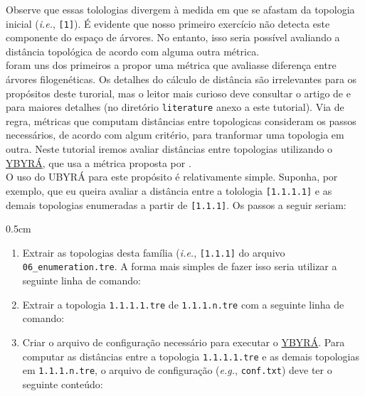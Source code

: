 \begin{refsection}

Observe que essas tolologias divergem à medida em que se afastam da topologia inicial (\textit{i.e.}, \texttt{[1]}). É evidente que nosso primeiro exercício não detecta este componente do espaço de árvores. No entanto, isso seria possível avaliando a distância topológica de acordo com alguma outra métrica.\\

	\textcite{Robinson_and_Foulds_1981} foram uns dos primeiros a propor uma métrica que avaliasse diferença entre árvores filogenéticas. Os detalhes do cálculo de distância são irrelevantes para os propósitos deste turorial, mas o leitor mais curioso deve consultar o artigo de \textcite{Robinson_and_Foulds_1981} e \textcite{BogdanowiczETGiaro_2013} para maiores detalhes (no diretório \texttt{literature} anexo a este tutorial). Via de regra, métricas que computam distâncias entre topologicas consideram os passos necessários, de acordo com algum critério, para tranformar uma topologia em outra. Neste tutorial iremos avaliar distâncias entre topologias utilizando o \href{http://www.ib.usp.br/grant/anfibios/researchSoftware.html/}{YBYRÁ}, que usa a métrica proposta por \textcite{Robinson_and_Foulds_1981}.\\

	O uso do UBYRÁ para este propósito é relativamente simple. Suponha, por exemplo, que eu queira avaliar a distância entre a tolologia \texttt{[1.1.1.1]} e as demais topologias enumeradas a partir de \texttt{[1.1.1]}. Os passos a seguir seriam:

\begin {myindentpar}{0.5cm}
\begin{enumerate}[\itshape i.]
	\item{} Extrair as topologias desta família (\textit{i.e.}, \texttt{[1.1.1]} do arquivo \texttt{06\_enumeration.tre}. A forma mais simples de fazer isso seria utilizar a seguinte linha de comando:

\shellcmd{egrep '\textbackslash[1\textbackslash.1\textbackslash.1\textbackslash..*' 06\_enumeration.tre > 1.1.1.n.tre}

	\item{} Extrair a topologia \texttt{1.1.1.1.tre} de \texttt{1.1.1.n.tre} com a seguinte linha de comando:


	\item{} Criar o arquivo de configuração necessário para executar o \href{http://www.ib.usp.br/grant/anfibios/researchSoftware.html/}{YBYRÁ}. Para computar as distâncias entre a topologia \texttt{1.1.1.1.tre} e as demais topologias em \texttt{1.1.1.n.tre}, o arquivo de configuração (\textit{e.g.}, \texttt{conf.txt}) deve ter o seguinte conteúdo:


\end{enumerate}
\end{myindentpar}
\end{refsection}
